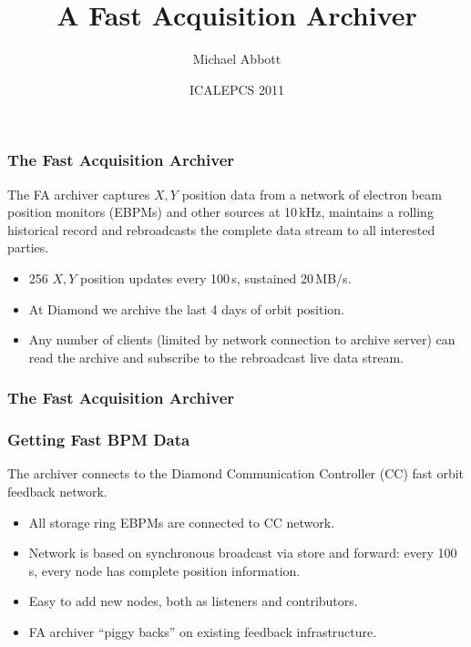\documentclass{beamer}
\title[The FA Archiver]{A Fast Acquisition Archiver}
\author{Michael Abbott}
\institute[Diamond]{Diamond Light Source \\ \url{michael.abbott@diamond.ac.uk}}
\date{ICALEPCS 2011}
\begin{document}
\begin{frame}
\titlepage
\end{frame}



\begin{frame}\frametitle{The Fast Acquisition Archiver}

The FA archiver captures $X,Y$ position data from a network of electron beam
position monitors (EBPMs) and other sources at 10\,kHz, maintains a rolling
historical record and rebroadcasts the complete data stream to all interested
parties.

\begin{itemize}

\item 256 $X,Y$ position updates every 100\,\textmu s, sustained 20\,MB/s.

\item At Diamond we archive the last 4\textonehalf{} days of orbit position.

\item Any number of clients (limited by network connection to archive server)
can read the archive and subscribe to the rebroadcast live data stream.

\end{itemize}
\end{frame}



\begin{frame}\frametitle{The Fast Acquisition Archiver}
\begin{center}

\end{center}
\end{frame}



\begin{frame}\frametitle{Getting Fast BPM Data}

The archiver connects to the Diamond Communication Controller (CC) fast orbit
feedback network.

\begin{itemize}

\item All storage ring EBPMs are connected to CC network.

\item Network is based on synchronous broadcast via store and forward: every
100\,\textmu s, every node has complete position information.

\item Easy to add new nodes, both as listeners and contributors.

\item FA archiver ``piggy backs'' on existing feedback infrastructure.

\end{itemize}

\end{frame}
\end{document}
